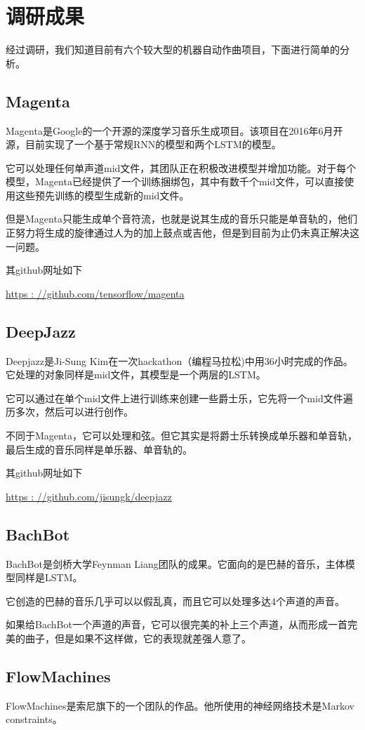 \section{调研成果}
经过调研，我们知道目前有六个较大型的机器自动作曲项目，下面进行简单的分析。
    \subsection{Magenta}
    Magenta是Google的一个开源的深度学习音乐生成项目。该项目在2016年6月开源，目前实现了一个基于常规RNN的模型和两个LSTM的模型。

    它可以处理任何单声道mid文件，其团队正在积极改进模型并增加功能。对于每个模型，Magenta已经提供了一个训练捆绑包，其中有数千个mid文件，可以直接使用这些预先训练的模型生成新的mid文件。

    但是Magenta只能生成单个音符流，也就是说其生成的音乐只能是单音轨的，他们正努力将生成的旋律通过人为的加上鼓点或吉他，但是到目前为止仍未真正解决这一问题。

    其github网址如下

    \url{https : //github.com/tensorflow/magenta}

    \subsection{DeepJazz}
    Deepjazz是Ji-Sung Kim在一次hackathon（编程马拉松)中用36小时完成的作品。它处理的对象同样是mid文件，其模型是一个两层的LSTM。

    它可以通过在单个mid文件上进行训练来创建一些爵士乐，它先将一个mid文件遍历多次，然后可以进行创作。

    不同于Magenta，它可以处理和弦。但它其实是将爵士乐转换成单乐器和单音轨，最后生成的音乐同样是单乐器、单音轨的。

    其github网址如下

    \url{https : //github.com/jisungk/deepjazz}

    \subsection{BachBot}
    BachBot是剑桥大学Feynman Liang团队的成果。它面向的是巴赫的音乐，主体模型同样是LSTM。

    它创造的巴赫的音乐几乎可以以假乱真，而且它可以处理多达4个声道的声音。

    如果给BachBot一个声道的声音，它可以很完美的补上三个声道，从而形成一首完美的曲子，但是如果不这样做，它的表现就差强人意了。

    \subsection{FlowMachines}
    FlowMachines是索尼旗下的一个团队的作品。他所使用的神经网络技术是Markov constraints。

